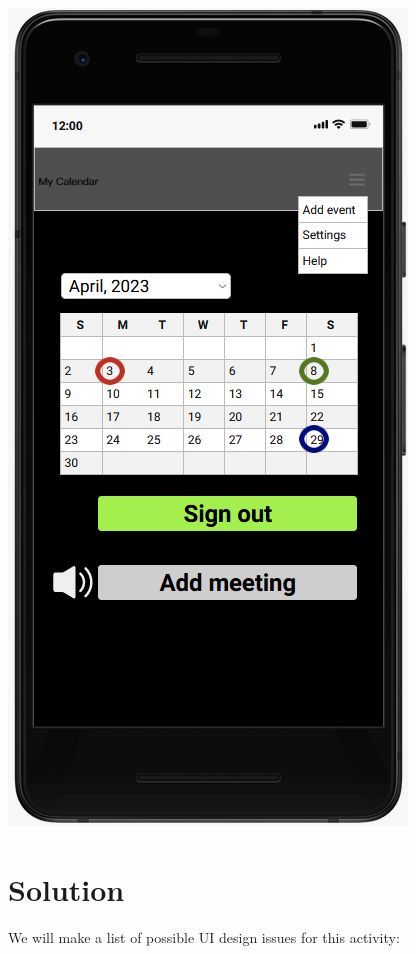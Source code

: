 \documentclass[12pt]{book}
\begin{document}
\includegraphics[scale=0.6]{images/activity.png}

\section*{Solution}
We will make a list of possible UI design issues for this activity:
\end{document}
